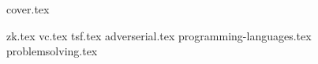 \documentclass{book}
\begin{document}
{cover.tex}

\tableofcontents

{zk.tex}
{vc.tex}
{tsf.tex}
{adverserial.tex}
{programming-languages.tex}
{problemsolving.tex}

\clearpage\printindex
\end{document}
